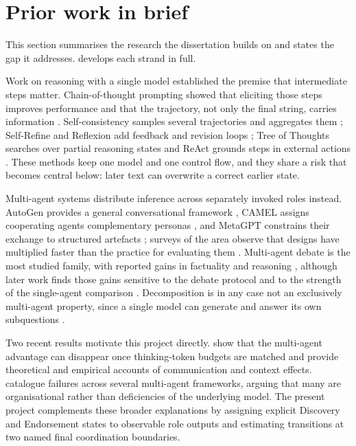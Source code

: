 \section{Prior work in brief}

This section summarises the research the dissertation builds on and states the gap it addresses.
 develops each strand in full.

Work on reasoning with a single model established the premise that intermediate steps matter. Chain-of-thought
prompting showed that eliciting those steps improves performance and that the trajectory, not only the final
string, carries information \citep{wei2022chain}. Self-consistency samples several trajectories and aggregates
them \citep{wang2023selfconsistency}; Self-Refine and Reflexion add feedback and revision loops
\citep{madaan2023selfrefine,shinn2023reflexion}; Tree of Thoughts searches over partial reasoning states and
ReAct grounds steps in external actions \citep{yao2023tot,yao2023react}. These methods keep one model and one
control flow, and they share a risk that becomes central below: later text can overwrite a correct earlier
state.

Multi-agent systems distribute inference across separately invoked roles instead. AutoGen provides a general
conversational framework \citep{wu2023autogen}, CAMEL assigns cooperating agents complementary personas
\citep{li2023camel}, and MetaGPT constrains their exchange to structured artefacts \citep{hong2024metagpt};
surveys of the area observe that designs have multiplied faster than the practice for evaluating them
\citep{guo2024survey}. Multi-agent debate is the most studied family, with reported gains in factuality and
reasoning \citep{du2023debate,liang2023mad}, although later work finds those gains sensitive to the debate
protocol and to the strength of the single-agent comparison \citep{smit2024mad,wang2024rethinking}.
Decomposition is in any case not an exclusively multi-agent property, since a single model can generate and
answer its own subquestions \citep{zhou2023leasttomost,khot2023decomposed}.

Two recent results motivate this project directly. \citet{tran2026single} show that the multi-agent advantage
can disappear once thinking-token budgets are matched and provide theoretical and empirical accounts of
communication and context effects. \citet{cemri2025why} catalogue failures across several multi-agent
frameworks, arguing that many are organisational rather than deficiencies of the underlying model. The
present project complements these broader explanations by assigning explicit Discovery and Endorsement
states to observable role outputs and estimating transitions at two named final coordination boundaries.

